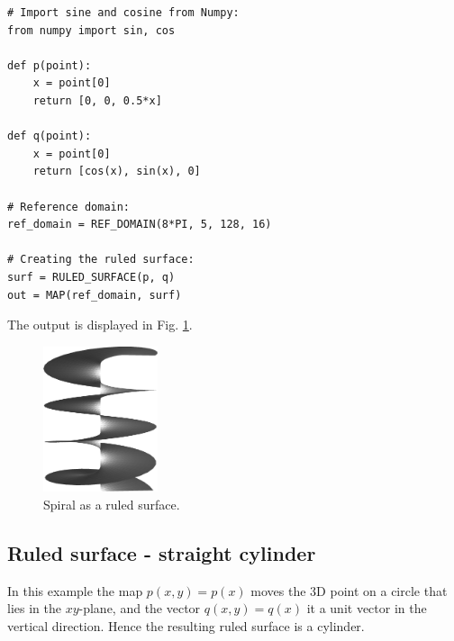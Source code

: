 \begin{bbox}
\begin{verbatim}
# Import sine and cosine from Numpy:
from numpy import sin, cos

def p(point):
    x = point[0]
    return [0, 0, 0.5*x]
  
def q(point):
    x = point[0]
    return [cos(x), sin(x), 0]

# Reference domain:  
ref_domain = REF_DOMAIN(8*PI, 5, 128, 16)

# Creating the ruled surface:
surf = RULED_SURFACE(p, q)
out = MAP(ref_domain, surf)
\end{verbatim}
\end{bbox}
\vspace{6mm}

\noindent
The output is displayed in Fig. \ref{fig:curves-7}.\\

\begin{figure}[!ht]
\begin{center}
\includegraphics[width=0.3\textwidth]{img/curves-7.png}
\end{center}
\vspace{-4mm}
\caption{Spiral as a ruled surface.}
\label{fig:curves-7}
\end{figure}

\subsection{Ruled surface - straight cylinder}

In this example the map $p(x, y) = p(x)$ moves the 3D point on a circle 
that lies in the $xy$-plane, and the vector $q(x, y) = q(x)$ it a unit vector 
in the vertical direction. Hence the resulting ruled surface is a cylinder. \\

